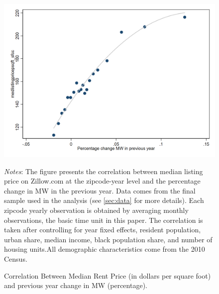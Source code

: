 \begin{figure}[htb]
    \centering
    \caption{Correlation Between Median Rent Price (in dollars per square foot) and previous year change in MW (percentage).}
    \label{appfig:binsc_listing_mwpctchange}
    \includegraphics[width=0.75\linewidth]{draft_june20/tempfigure/binsc_medlistingpricepsqft_sfcc_pctMWch.png}
    \begin{minipage}{.95\textwidth} \footnotesize
		\vspace{2mm} 
		\textit{Notes}: The figure presents the correlation between median listing price on Zillow.com at the zipcode-year level and the percentage change in MW in the previous year. Data comes from the final sample used in the analysis (see \autoref{sec:data} for more details). Each zipcode yearly observation is obtained by averaging monthly observations, the basic time unit in this paper. The correlation is taken after controlling for year fixed effects, resident population, urban share, median income, black population share, and number of housing units.All demographic characteristics come from the 2010 Census.
	\end{minipage}
\end{figure}

